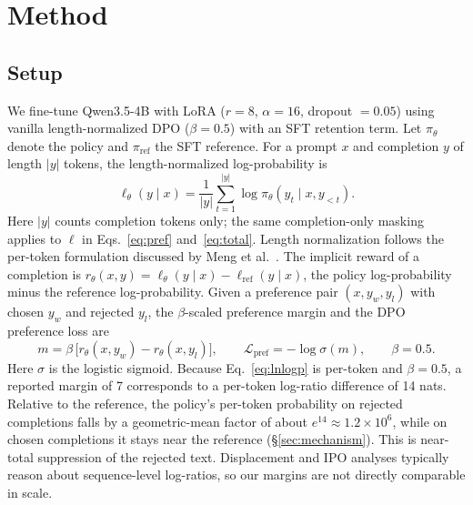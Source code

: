 \documentclass{article}
\begin{document}
\section{Method}
\label{sec:method}

\subsection{Setup}
\label{sec:setup}
We fine-tune Qwen3.5-4B with LoRA ($r = 8$, $\alpha = 16$, dropout $= 0.05$) using vanilla length-normalized DPO ($\beta = 0.5$) with an SFT retention term. Let $\pi_\theta$ denote the policy and $\pi_{\text{ref}}$ the SFT reference. For a prompt $x$ and completion $y$ of length $|y|$ tokens, the length-normalized log-probability is
\begin{equation}
\ell_\theta(y \mid x) = \frac{1}{|y|} \sum_{t=1}^{|y|} \log \pi_\theta(y_t \mid x, y_{<t}).
\label{eq:lnlogp}
\end{equation}
Here $|y|$ counts completion tokens only; the same completion-only masking applies to $\ell$ in Eqs.~\eqref{eq:pref} and~\eqref{eq:total}. Length normalization follows the per-token formulation discussed by Meng et al.\ \citep{meng2024simpo}. The implicit reward of a completion is $r_\theta(x, y) = \ell_\theta(y \mid x) - \ell_{\text{ref}}(y \mid x)$, the policy log-probability minus the reference log-probability. Given a preference pair $(x, y_w, y_l)$ with chosen $y_w$ and rejected $y_l$, the $\beta$-scaled preference margin and the DPO preference loss are
\begin{equation}
m = \beta\,\big[r_\theta(x, y_w) - r_\theta(x, y_l)\big], \qquad \mathcal{L}_{\text{pref}} = -\log \sigma(m), \qquad \beta = 0.5.
\label{eq:pref}
\end{equation}
Here $\sigma$ is the logistic sigmoid. Because Eq.~\eqref{eq:lnlogp} is per-token and $\beta = 0.5$, a reported margin of 7 corresponds to a per-token log-ratio difference of 14 nats. Relative to the reference, the policy's per-token probability on rejected completions falls by a geometric-mean factor of about $e^{14} \approx 1.2 \times 10^{6}$, while on chosen completions it stays near the reference (\S\ref{sec:mechanism}). This is near-total suppression of the rejected text. Displacement and IPO analyses typically reason about sequence-level log-ratios, so our margins are not directly comparable in scale.
\end{document}
